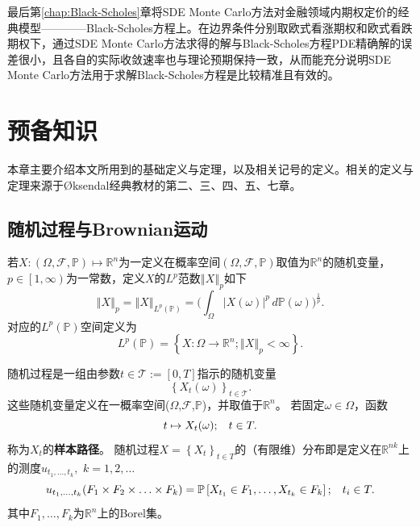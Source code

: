 \documentclass[oneside]{sysuthesis}
\begin{document}
最后第\ref{chap:Black-Scholes}章将SDE Monte Carlo方法对金融领域内期权定价的经典模型————Black-Scholes方程上。在边界条件分别取欧式看涨期权和欧式看跌期权下，通过SDE Monte Carlo方法求得的解与Black-Scholes方程PDE精确解的误差很小，且各自的实际收敛速率也与理论预期保持一致，从而能充分说明SDE Monte Carlo方法用于求解Black-Scholes方程是比较精准且有效的。
\newpage

\chapter{预备知识}\label{chap:pre}

本章主要介绍本文所用到的基础定义与定理，以及相关记号的定义。相关的定义与定理来源于\O ksendal经典教材\cite{SDE_book_BO}的第二、三、四、五、七章。

\section{随机过程与Brownian运动}    

\begin{definition}[$L^p(\mathbb{P})$空间]\label{def:Lp_space}
	若$X:(\Omega,\mathcal{F},\mathbb{P})\mapsto\mathbb{R}^n$为一定义在概率空间$(\Omega,\mathcal{F},\mathbb{P})$取值为$\mathbb{R}^n$的随机变量，$p\in \left [1,\infty \right )$为一常数，定义$X$的$L^p$范数$\left \Vert X \right \Vert_p$如下
	\[
	\left \Vert X \right \Vert_p=\left \Vert X \right \Vert_{L^p(\mathbb{P})}=\bigg(\int_{\Omega} \left \vert X(\omega) \right \vert^p \, d\mathbb{P}(\omega)\bigg)^{\frac{1}{p}}.
	\]
	对应的$L^p(\mathbb{P})$空间定义为
	\[
	L^p(\mathbb{P})=\left \{ X:\Omega \to \mathbb{R}^n;\left \Vert X \right \Vert_p<\infty \right \}.
	\]
\end{definition}

\begin{definition}[随机过程]\label{def:Stochastic_Process}
	随机过程是一组由参数$t\in\mathcal{T}:=[0,T]$指示的随机变量
	\[
	\left \{ X_t(\omega)\right \}_{t\in \mathcal{T}}.
	\]
	这些随机变量定义在一概率空间($\Omega$,$\mathcal{F}$,$\mathbb{P}$)，并取值于$\mathbb{R}^n$。
	若固定$\omega \in \Omega$，函数
	\[
	t \mapsto X_t(\omega);\hspace{0.3cm}t \in T.
	\]
	称为$X_t$的\textbf{样本路径}。
	随机过程$X=\left\{X_t\right\}_{t\in T}$的（有限维）分布即是定义在$\mathbb{R}^{nk}$上的测度$u_{t_1,\ldots,t_k},$
	\noindent$k=1,2,\ldots$
	\[
	u_{t_1,\ldots,t_k}(F_1\times F_2\times \ldots\times F_k)=\mathbb{P}\left[X_{t_1}\in F_1,\ldots,X_{t_k}\in F_k\right];\hspace{0.3cm}t_i\in T.
	\]
	其中$F_1,\ldots,F_k$为$\mathbb{R}^n$上的Borel集。
\end{definition}
\end{document}

